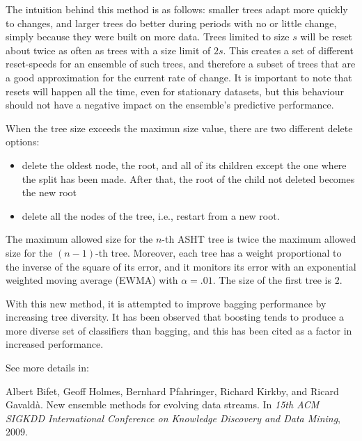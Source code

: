 \documentclass[a4paper,12pt,twoside]{book}
\begin{document}
The intuition behind this method is as follows: smaller trees adapt more quickly to changes,
and larger trees do better during periods with no or little change,
simply because they were built on more data.
Trees limited to size $s$ will be reset about twice as often as
trees with a size limit of $2s$.
This creates a set of different reset-speeds for an ensemble of such trees, and
therefore a subset of trees that are a good approximation for the current rate of change. 
It is important to note that resets will happen all the time, even for stationary datasets,
but this behaviour should not have a negative impact on the ensemble's predictive performance.

When the tree size exceeds
the maximun size value, there are two different delete options:
\begin{itemize}
 \item delete the oldest node, the root, and all of its children %
except the one where the split has
been made. After that, the root of the
child not deleted becomes the new root

 \item delete all the nodes of the tree, i.e., restart from a new root.
\end{itemize}

The maximum allowed size for the $n$-th ASHT tree is
twice the maximum allowed size for the $(n-1)$-th tree. Moreover, each tree
has a weight proportional to the inverse of the square of its error, and
it monitors its error
with an exponential weighted moving average (EWMA) with $\alpha=.01$. The size of the first tree is $2$. 

With this new method, it is attempted to improve bagging performance by increasing tree diversity.
It has been observed that boosting tends to produce a more diverse set of classifiers
than bagging, and this has been cited as a factor in increased performance.

See more details in:

\begin{itemize}
Albert Bifet, Geoff Holmes, Bernhard Pfahringer, Richard Kirkby, and Ricard
  Gavald\`a.
\newblock New ensemble methods for evolving data streams.
\newblock In {\em 15th ACM SIGKDD International Conference on Knowledge
  Discovery and Data Mining}, 2009.
\end{itemize}
\end{document}
